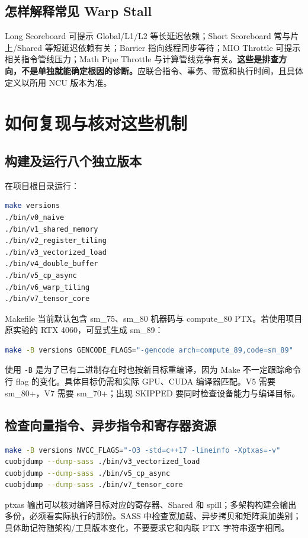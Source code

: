 \documentclass[UTF8,11pt,a4paper,fontset=fandol]{ctexart}
\newcommand{\code}[1]{\nolinkurl{#1}}
\newcommand{\pagebreakhere}{\clearpage}
\begin{document}
\subsection{怎样解释常见 Warp Stall}
Long Scoreboard 可提示 Global/L1/L2 等长延迟依赖；Short Scoreboard 常与片上/Shared 等短延迟依赖有关；Barrier 指向线程同步等待；MIO Throttle 可提示相关指令管线压力；Math Pipe Throttle 与计算管线竞争有关。\textbf{这些是排查方向，不是单独就能确定根因的诊断。}应联合指令、事务、带宽和执行时间，且具体定义以所用 NCU 版本为准\cite{ncu}。
\pagebreakhere

\section{如何复现与核对这些机制}
\subsection{构建及运行八个独立版本}
在项目根目录运行：
\begin{lstlisting}[language=bash,numbers=none]
make versions
./bin/v0_naive
./bin/v1_shared_memory
./bin/v2_register_tiling
./bin/v3_vectorized_load
./bin/v4_double_buffer
./bin/v5_cp_async
./bin/v6_warp_tiling
./bin/v7_tensor_core
\end{lstlisting}
Makefile 当前默认包含 sm\_75、sm\_80 机器码与 compute\_80 PTX。若使用项目原实验的 RTX 4060，可显式生成 sm\_89：
\begin{lstlisting}[language=bash,numbers=none]
make -B versions GENCODE_FLAGS="-gencode arch=compute_89,code=sm_89"
\end{lstlisting}
使用 \code{-B} 是为了已有二进制存在时也按新目标重编译，因为 Make 不一定跟踪命令行 flag 的变化。具体目标仍需和实际 GPU、CUDA 编译器匹配。V5 需要 sm\_80+，V7 需要 sm\_70+；出现 SKIPPED 要同时检查设备能力与编译目标。

\subsection{检查向量指令、异步指令和寄存器资源}
\begin{lstlisting}[language=bash,numbers=none]
make -B versions NVCC_FLAGS="-O3 -std=c++17 -lineinfo -Xptxas=-v"
cuobjdump --dump-sass ./bin/v3_vectorized_load
cuobjdump --dump-sass ./bin/v5_cp_async
cuobjdump --dump-sass ./bin/v7_tensor_core
\end{lstlisting}
ptxas 输出可以核对编译目标对应的寄存器、Shared 和 spill；多架构构建会输出多份，必须看实际执行的那份。SASS 中检查宽加载、异步拷贝和矩阵乘加类别；具体助记符随架构/工具版本变化，不要要求它和内联 PTX 字符串逐字相同。
\end{document}
